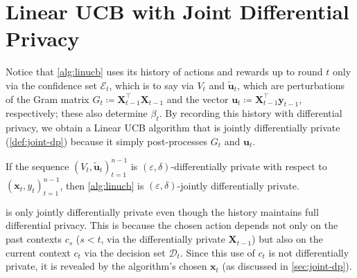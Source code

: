 \documentclass{article}
\renewcommand{\vec}[1]{\bm{#1}}
\newcommand{\defeq}{\coloneq}
\newcommand{\E}{\mathcal{E}}
\providecommand\transp{\top}
\let\transpsymbol\transp
\renewcommand{\transp}[1]{#1^\transpsymbol}
\newcommand{\Dset}[1]{\mathcal{D}_{#1}}
\newcommand{\XtX}[1]{\transp{#1}{#1}}
\begin{document}
\section{Linear UCB with Joint Differential Privacy}
\label{sec:alg-dp}

Notice that \cref{alg:linucb} uses its history of actions and rewards
up to round $t$ only via the confidence set $\E_t$, which is to say
via $V_t$ and $\tilde{\vec u}_t$, which are perturbations of the Gram
matrix $G_t\defeq\XtX{\vec X_{t-1}}$ and the vector
$\vec u_t \defeq \transp{\vec X_{t-1}} \vec y_{t-1}$, respectively;
these also determine $\beta_t$.  By recording this history with
differential privacy, we obtain a Linear UCB algorithm that is jointly
differentially private (\cref{def:joint-dp}) because it simply
post-processes $G_t$ and $\vec u_t$.

\begin{claim}
  If the sequence $(V_t,\tilde{\vec u}_t)_{t=1}^{n-1}$ is
  $(\varepsilon,\delta)$-differentially private with respect to
  $(\vec x_t, y_t)_{t=1}^{n-1}$, then \cref{alg:linucb} is
  $(\varepsilon,\delta)$-jointly differentially private.
\end{claim}

\begin{remark}
   is only jointly differentially private even though
  the history maintains full differential privacy.  This is because
  the chosen action depends not only on the past contexts $c_s$
  ($s < t$, via the differentially private $\vec X_{t-1}$) but also on
  the current context $c_t$ via the decision set $\Dset{t}$.  Since
  this use of $c_t$ is not differentially private, it is revealed by
  the algorithm's chosen $\vec x_t$ (as discussed in
  \cref{sec:joint-dp}).
\end{remark}
\end{document}

